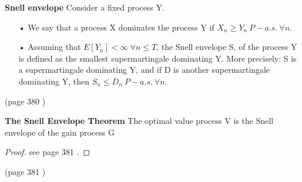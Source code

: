 \theoremstyle{definition}
\begin{definition}{\textbf{Snell envelope}}\label{snellEnvelope}
Consider a fixed process Y.
\begin{enumerate}
\item[•] We say that a process X dominates the process Y if $X_n \geq Y_n \ P-a.s. \ \forall n$.
\item[•] Assuming that $E[Y_n] < \infty  \ \forall n \leq T$, the Snell envelope S, of the process Y is defined as the smallest supermartingale dominating Y. More precisely: S is a supermartingale dominating Y, and if D is another supermartingale dominating Y, then $S_n\leq D_n \ P-a.s. \ \forall n$.
\end{enumerate}
(page 380 \parencite{Bjork19})
\end{definition}

\begin{theorem}\label{SnellEnvelopeTheorem}
\textbf{The Snell Envelope Theorem} The optimal value process V is the Snell envelope of the gain process G
\begin{proof}
see page 381  \parencite{Bjork19}.
\end{proof}
(page 381 \parencite{Bjork19})
\end{theorem}

